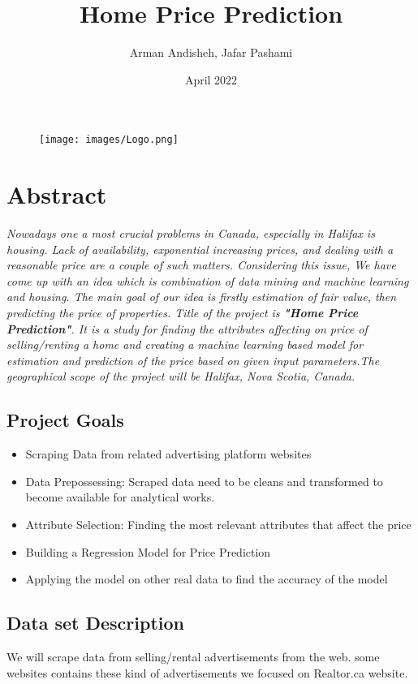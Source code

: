\documentclass{article}
\begin{document}
\begin{figure}
    \centering
    \texttt{[image: images/Logo.png]}
\end{figure}

\title{\textbf{Home Price Prediction}}
\author{Arman Andisheh, Jafar Pashami}
\date{April 2022}

\maketitle

\tableofcontents

\section{Abstract}
\emph{Nowadays one a most crucial problems in Canada, especially in Halifax is housing. Lack of availability, exponential increasing prices, and dealing with a reasonable price are a couple of such matters. Considering this issue, We have come up with an idea which is combination of data mining and machine learning and housing. The main goal of our idea is firstly estimation of fair value, then predicting the price of properties. Title of the project is \textbf{"Home Price Prediction"}.
It is a study for finding the attributes affecting on price of selling/renting a home and creating a machine learning based model for estimation and prediction of the price based on given input parameters.The geographical scope of the project will be Halifax, Nova Scotia, Canada.}
\subsection{Project Goals}
\begin{itemize}
    \item Scraping Data from related advertising platform websites
    \item Data Prepossessing: Scraped data need to be cleans and transformed to become available for analytical works.
    \item Attribute Selection: Finding the most relevant attributes that affect the price
    \item Building a Regression Model for Price Prediction
    \item Applying the model on other real data to find the accuracy of the model
\end{itemize}

\subsection{Data set Description}
We will scrape data from selling/rental advertisements from the web. some websites contains these kind of advertisements we focused on Realtor.ca website.
\end{document}
